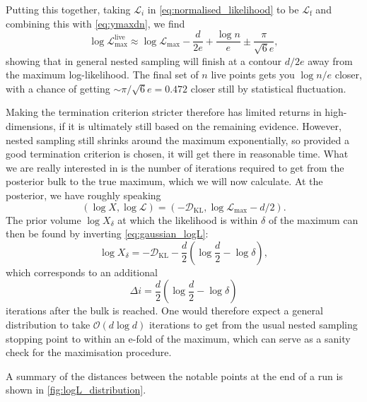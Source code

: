 \documentclass[usenatbib]{mnras}
\newcommand{\Like}{\mathcal{L}}
\newcommand{\DKL}{\mathcal{D}_\mathrm{KL}}
\newcommand{\logLmax}{\log \Like_\mathrm{max}}
\begin{document}
\par
Putting this together, taking $\mathcal{L}_i$ in \eqref{eq:normalised_likelihood} to be $\mathcal{L}_\mathrm{f}$ and combining this with \eqref{eq:ymaxdn}, we find
\begin{equation}
    \boxed{
        \log{\mathcal{L}}_\mathrm{max}^\mathrm{live} \approx \log\mathcal{L}_\mathrm{max} - \frac{d}{2e} + \frac{\log n}{e} \pm \frac{\pi}{\sqrt{6}e}
    },
\end{equation}
showing that in general nested sampling will finish at a contour $d/2e$ away from the maximum log-likelihood. The final set of $n$ live points gets you $\log n/e$ closer, with a chance of getting $\sim\pi/\sqrt{6}e=0.472$ closer still by statistical fluctuation. 
\par
Making the termination criterion stricter therefore has limited returns in high-dimensions, if it is ultimately still based on the remaining evidence. However, nested sampling still shrinks around the maximum exponentially, so provided a good termination criterion is chosen, it will get there in reasonable time. What we are really interested in is the number of iterations required to get from the posterior bulk to the true maximum, which we will now calculate. At the posterior, we have roughly speaking
\begin{equation}
    (\log X, \log\Like) = (-\DKL, \logLmax - d/2).
\end{equation}
The prior volume $\log X_\delta$ at which the likelihood is within $\delta$ of the maximum can then be found by inverting \cref{eq:gaussian_logL}:
\begin{equation}
    \log X_\delta = -\DKL - \frac{d}{2} \left(\log \frac{d}{2} - \log \delta\right),
\end{equation}
which corresponds to an additional
\begin{equation}
    \Delta i = \frac{d}{2} \left(\log \frac{d}{2} - \log \delta\right)
\end{equation}
iterations after the bulk is reached. One would therefore expect a general distribution to take $\mathcal{O}(d \log d)$ iterations to get from the usual nested sampling stopping point to within an e-fold of the maximum, which can serve as a sanity check for the maximisation procedure. 
\par
A summary of the distances between the notable points at the end of a run is shown in \cref{fig:logL_distribution}.
\end{document}
